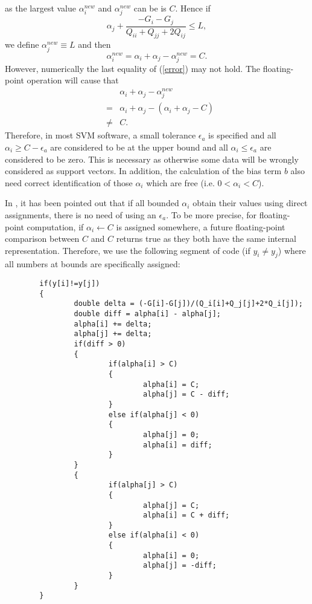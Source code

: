 \documentclass[11pt]{article}
\theoremstyle{break}
\begin{document}
as the largest value 
$\alpha_i^{new}$
and
$\alpha_j^{new}$
can be 
is $C$.
Hence if
\begin{equation*}
\alpha_{j} + 
\frac{-G_i- 
G_j}
{Q_{i i}+Q_{j j}+
2Q_{i j}}
\leq L,  
\end{equation*}
we define
$\alpha_j^{new} \equiv L$
and then 
\begin{equation}
  \label{error}
\alpha_i^{new} 
= \alpha_i
+ \alpha_j - \alpha_j^{new}= C.
\end{equation}
However, numerically the last equality of
(\ref{error}) may not hold.
The floating-point operation will cause 
that 
\begin{eqnarray*}
&&\alpha_i
+ \alpha_j - \alpha_j^{new}\\
&= & 
\alpha_i
+ \alpha_j - 
(\alpha_i
+ \alpha_j - C) \\
& \neq & C.
\end{eqnarray*}
Therefore, in most SVM software, 
a small tolerance $\epsilon_a$
is specified and 
all 
$\alpha_i \geq C - \epsilon_a$ are 
considered to be at the upper bound and
all
$\alpha_i \leq \epsilon_a$ are considered 
to be zero.
This is necessary as otherwise some data
will be wrongly considered as support
vectors. In addition, the calculation 
of the bias term $b$ also need
correct identification of those
$\alpha_i$ which are free
(i.e. $0 < \alpha_i < C$).

In , it has been 
pointed out that if 
all bounded $\alpha_i$ obtain their
values using direct assignments,
there is no need of using an $\epsilon_a$.
To be more precise, for 
floating-point computation, if $\alpha_i
\leftarrow C$ is assigned somewhere,
a future 
floating-point comparison between
$C$ and $C$ returns true as they 
both have the same internal 
representation.
Therefore, we use the following 
segment of code (if 
$y_i \neq y_j$) where all numbers at bounds
are specifically assigned:

\addtolength{\baselineskip}{-6pt}
\begin{verbatim}
        if(y[i]!=y[j])
        {
                double delta = (-G[i]-G[j])/(Q_i[i]+Q_j[j]+2*Q_i[j]);
                double diff = alpha[i] - alpha[j];
                alpha[i] += delta;
                alpha[j] += delta;
                if(diff > 0)
                {
                        if(alpha[i] > C)
                        {
                                alpha[i] = C;
                                alpha[j] = C - diff;
                        }
                        else if(alpha[j] < 0)
                        {
                                alpha[j] = 0;
                                alpha[i] = diff;
                        }
                }
                {
                        if(alpha[j] > C)
                        {
                                alpha[j] = C;
                                alpha[i] = C + diff;
                        }
                        else if(alpha[i] < 0)
                        {
                                alpha[i] = 0;
                                alpha[j] = -diff;
                        }
                }
        }
\end{verbatim}
\addtolength{\baselineskip}{+6pt}
\end{document}
